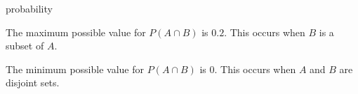 \begin{problem}{probability}


\solution
{
The maximum possible value for $P(A \cap B)$ is $0.2$. This occurs when $B$ is a subset of $A$.
}

\solution
{
The minimum possible value for $P(A \cap B)$ is $0$. This occurs when $A$ and $B$ are disjoint sets.
}

\end{problem}
